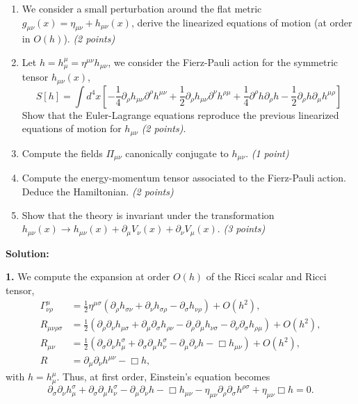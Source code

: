 \begin{enumerate}
    \item We consider a small perturbation around the flat metric $g_{\mu\nu}(x) = \eta_{\mu\nu} + h_{\mu\nu}(x)$, derive the linearized equations of motion (at order in $O(h)$). \textit{(2 points)}
    
    \item Let $h = h^\mu_\mu = \eta^{\mu\nu}h_{\mu\nu}$, we consider the Fierz-Pauli action for the symmetric tensor $h_{\mu\nu}(x)$,
    \begin{equation}
        S[h] = \int d^4x \left[ -\frac{1}{4}\partial_\rho h_{\mu\nu}\partial^\rho h^{\mu\nu} + \frac{1}{2}\partial_\rho h_{\mu\nu}\partial^\nu h^{\rho\mu} + \frac{1}{4}\partial^\rho h \partial_\rho h - \frac{1}{2}\partial_\rho h \partial_\mu h^{\mu\rho} \right]
    \end{equation}
    Show that the Euler-Lagrange equations reproduce the previous linearized equations of motion for $h_{\mu\nu}$ \textit{(2 points)}.
    
    \item Compute the fields $\Pi_{\mu\nu}$ canonically conjugate to $h_{\mu\nu}$. \textit{(1 point)}
    
    \item Compute the energy-momentum tensor associated to the Fierz-Pauli action. Deduce the Hamiltonian. \textit{(2 points)}
    
    \item Show that the theory is invariant under the transformation $h_{\mu\nu}(x) \to h_{\mu\nu}(x) + \partial_\mu V_\nu(x) + \partial_\nu V_\mu(x)$. \textit{(3 points)}
\end{enumerate}

\textbf{Solution:}

\textbf{1.} We compute the expansion at order $O(h)$ of the Ricci scalar and Ricci tensor,
\begin{equation}
\begin{aligned}
    \Gamma^\mu_{\nu\rho} &= \frac{1}{2}\eta^{\mu\sigma}(\partial_\rho h_{\sigma\nu} + \partial_\nu h_{\sigma\rho} - \partial_\sigma h_{\nu\rho}) + O(h^2), \\
    R_{\mu\nu\rho\sigma} &= \frac{1}{2}\left(\partial_\rho\partial_\nu h_{\mu\sigma} + \partial_\mu\partial_\sigma h_{\rho\nu} - \partial_\rho\partial_\mu h_{\nu\sigma} - \partial_\nu\partial_\sigma h_{\rho\mu}\right) + O(h^2), \\
    R_{\mu\nu} &= \frac{1}{2}\left(\partial_\sigma\partial_\nu h^\sigma_\mu + \partial_\sigma\partial_\mu h^\sigma_\nu - \partial_\mu\partial_\nu h - \Box h_{\mu\nu}\right) + O(h^2), \\
    R &= \partial_\mu\partial_\nu h^{\mu\nu} - \Box h,
\end{aligned}
\end{equation}
with $h = h^\mu_\mu$. Thus, at first order, Einstein's equation becomes
\begin{equation}
    \partial_\sigma\partial_\nu h^\sigma_\mu + \partial_\sigma\partial_\mu h^\sigma_\nu - \partial_\mu\partial_\nu h - \Box h_{\mu\nu} - \eta_{\mu\nu}\partial_\rho\partial_\sigma h^{\rho\sigma} + \eta_{\mu\nu}\Box h = 0.
\end{equation}

